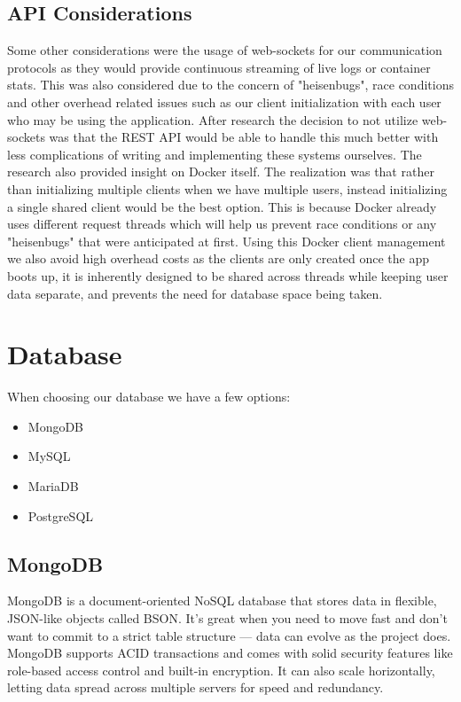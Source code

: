 \documentclass[12pt]{article}
\begin{document}
\subsection{API Considerations} \label{subsec:api-considerations}
Some other considerations were the usage of web-sockets for our communication protocols as they would provide continuous streaming of live logs or container stats. This was also considered due to the concern of "heisenbugs", race conditions and other overhead related issues such as our client initialization with each user who may be using the application. After research the decision to not utilize web-sockets was that the REST API would be able to handle this much better with less complications of writing and implementing these systems ourselves. The research also provided insight on Docker itself. The realization was that rather than initializing multiple clients when we have multiple users, instead initializing a single shared client would be the best option. This is because Docker already uses different request threads which will help us prevent race conditions or any "heisenbugs" that were anticipated at first. Using this Docker client management we also avoid high overhead costs as the clients are only created once the app boots up, it is inherently designed to be shared across threads while keeping user data separate, and prevents the need for database space being taken.

\section{Database}
When choosing our database we have a few options:
\begin{itemize}
	\item MongoDB
	\item MySQL
	\item MariaDB
	\item PostgreSQL
\end{itemize}
\subsection{MongoDB}
MongoDB is a document-oriented NoSQL database that stores data in flexible, JSON-like objects called BSON. It’s great when you need to move fast and don’t want to commit to a strict table structure — data can evolve as the project does. MongoDB supports ACID transactions and comes with solid security features like role-based access control and built-in encryption. It can also scale horizontally, letting data spread across multiple servers for speed and redundancy.
\end{document}
